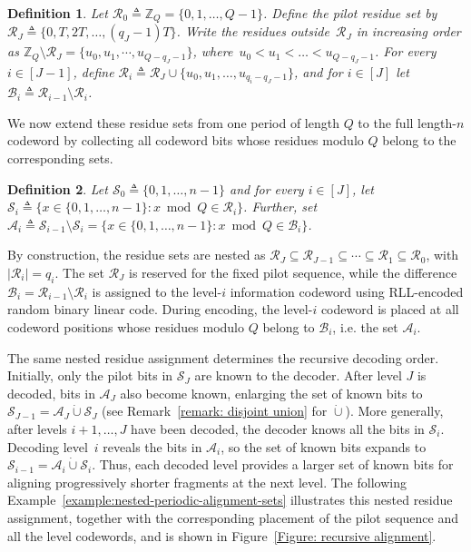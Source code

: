 \documentclass[journal,letterpaper,onecolumn,11pt]{IEEEtran}
\newcommand{\bZ}{\mathbb{Z}}
\newcommand{\cA}{\mathcal{A}}
\newcommand{\cB}{\mathcal{B}}
\newcommand{\cR}{\mathcal{R}}
\newcommand{\cS}{\mathcal{S}}
\newtheorem{definition}{Definition}
\begin{document}
\begin{definition}
\label{definition:nested-residue-sets}
Let \(\cR_0\triangleq\bZ_Q=\{0,1,\ldots,Q-1\}\). Define the \emph{pilot
residue set} by
\(\cR_J\triangleq\{0,T,2T,\ldots,(q_J-1)T\}\). 
Write the residues outside~$\cR_J$ in increasing order as
\(\bZ_Q\setminus\cR_J
=\{u_0,u_1,\cdots,u_{Q-q_J-1}\}\), where~$u_0<u_1<\ldots<u_{Q-q_J-1}$. 
For every \(i\in[J-1]\), define
\(\cR_i\triangleq\cR_J\cup
\{u_0,u_1,\ldots,u_{q_i-q_J-1}\}\), and for $i\in[J]$ let \(\cB_i\triangleq\cR_{i-1}\setminus\cR_i\).
\end{definition}

We now extend these residue sets from one period of length \(Q\) to the full length-\(n\) codeword by collecting all codeword bits whose residues modulo \(Q\) belong to the corresponding sets.

\begin{definition}\label{definition: Si and Ai}
    Let \(\cS_0\triangleq\{0,1,\ldots,n-1\}\) and for every \(i\in[J]\), let
\(\cS_i\triangleq\{x\in\{0,1,\ldots,n-1\}:x\bmod Q\in\cR_i\}\).
Further, set \(\cA_i\triangleq\cS_{i-1}\setminus\cS_i=\{x\in\{0,1,\ldots,n-1\}:x\bmod Q\in\cB_i\}\). 
\end{definition}



By construction, the residue sets are nested as
\(\cR_J\subseteq\cR_{J-1}\subseteq\cdots\subseteq\cR_1\subseteq\cR_0\),
with \(|\cR_i|=q_i\). 
The set \(\cR_J\) is reserved for the fixed
pilot sequence, while the difference
\(\cB_i=\cR_{i-1}\setminus\cR_i\) is assigned to the level-\(i\)
information codeword using RLL-encoded random binary linear code.
During encoding, the level-\(i\) codeword is
placed at all codeword positions whose residues modulo \(Q\) belong to
\(\cB_i\), i.e. the set \(\cA_i\).

The same nested residue assignment determines the recursive decoding order. 
Initially, only the pilot bits in \(\cS_J\) are known to the decoder. 
After level \(J\) is decoded,
bits in \(\cA_J\) also become known, enlarging the set of known bits to
\(\cS_{J-1}=\cA_J\mathbin{\dot\cup}\cS_J\) (see Remark~\ref{remark: disjoint union} for $\dot\cup$). 
More generally, after levels
\(i+1,\ldots,J\) have been decoded, the decoder knows all the bits in
\(\cS_i\). 
Decoding level~\(i\) reveals the bits in
\(\cA_i\), so the set of known bits expands to
\(\cS_{i-1}=\cA_i\mathbin{\dot\cup}\cS_i\). 
Thus, each decoded level
provides a larger set of known bits for aligning progressively shorter fragments at the
next level.
The following Example~\ref{example:nested-periodic-alignment-sets} illustrates this nested residue assignment, together with the corresponding placement of the
pilot sequence and all the level codewords, and is shown in Figure~\ref{Figure: recursive alignment}.
\end{document}
